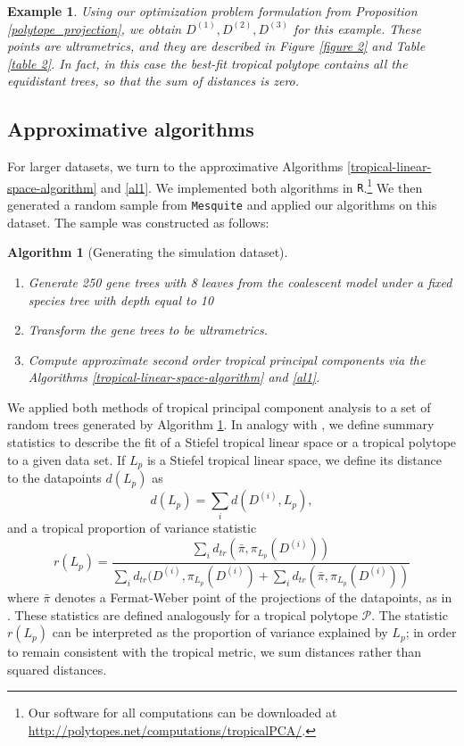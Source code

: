 \documentclass[12pt]{extarticle}
\numberwithin{theorem}{section}
\newtheorem{example}[theorem]{Example}
\newtheorem{algorithm}[theorem]{Algorithm}
\begin{document}
\begin{example}
Using our optimization problem formulation from Proposition \ref{polytope_projection}, we obtain $D^{(1)},D^{(2)},D^{(3)}$ for this example. These points are ultrametrics, and they are described in Figure \ref{figure 2} and Table \ref{table 2}. In fact, in this case the best-fit tropical polytope contains all the equidistant trees, so that the sum of distances is zero.
\end{example}

\subsection{Approximative algorithms}
For larger datasets, we turn to the approximative Algorithms \ref{tropical-linear-space-algorithm} and \ref{al1}. We implemented both algorithms in {\tt R}.\footnote{Our software for all computations can be downloaded at \url{http://polytopes.net/computations/tropicalPCA/}.} We then generated a random sample from {\tt Mesquite} \cite{Mesq} and applied our algorithms on this dataset. The sample was constructed as follows:
\begin{algorithm}[Generating the simulation dataset]\label{sim_data} 
                                \qquad  \qquad \qquad 

\begin{enumerate}
\item Generate 250 gene trees with 8 leaves from the coalescent model under a fixed species tree with depth equal to 10 
\item Transform the gene trees to be ultrametrics.
\item Compute approximate second order tropical principal components via the Algorithms \ref{tropical-linear-space-algorithm} and \ref{al1}.
\end{enumerate}
\end{algorithm}

We applied both methods of tropical principal component analysis to a set of random trees generated by Algorithm \ref{sim_data}. In analogy with \cite{NTWY}, we define summary statistics to describe the fit of a Stiefel tropical linear space
or a tropical polytope to a given data
set. If $L_p$ is a Stiefel tropical linear space, we define its distance to the datapoints $d(L_p)$ as
\[d(L_p) = \sum_i d(D^{(i)}, L_p),\]
and a tropical proportion of variance statistic
\[r(L_p) = \frac{\sum_i d_{tr}(\bar \pi, \pi_{L_p}(D^{(i)}))}{\sum_i d_{tr}(D^{(i)}, \pi_{L_p}(D^{(i)})+\sum_i d_{tr}(\bar \pi, \pi_{L_p}(D^{(i)}))}\]
where $\bar \pi$ denotes a Fermat-Weber point of the projections of the datapoints, as in \cite{LY}. These statistics are defined analogously for a tropical polytope $\mathcal P$. The statistic $r(L_p)$ can be interpreted as the proportion of variance explained by $L_p$; in order to remain consistent with the tropical metric, we sum distances rather than squared distances. 
\end{document}
